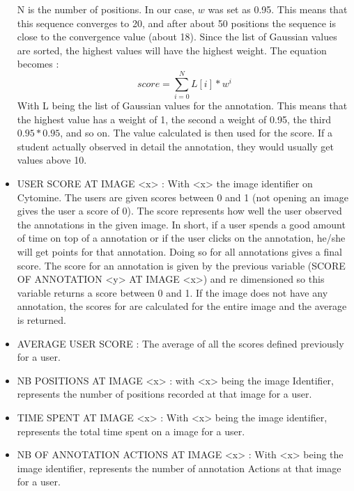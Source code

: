 \documentclass[a4paper,11pt]{report}
\numberwithin{figure}{section} %
\begin{document}
\begin{itemize}
N is the number of positions.
In our case, $w$ was set as 0.95.
This means that this sequence converges to 20, and after about 50 positions the sequence is close to the convergence value (about 18).
Since the list of Gaussian values are sorted, the highest values will have the highest weight.
The equation becomes :
	\[score = \sum\limits_{i=0}^N L[i]*w^i\]
With L being the list of Gaussian values for the annotation.
This means that the highest value has a weight of 1, the second a weight of 0.95, the third $0.95*0.95$, and so on.
The value calculated is then used for the score.
If a student actually observed in detail the annotation, they would usually get values above 10.\\

    \item[\textbullet] USER SCORE AT IMAGE <x> : With <x> the image identifier on Cytomine.
    The users are given scores between 0 and 1 (not opening an image gives the user a score of 0).
    The score represents how well the user observed the annotations in the given image.
    In short, if a user spends a good amount of time on top of a annotation or if the user clicks on the annotation, he/she will get points for that annotation.
    Doing so for all annotations gives a final score.
    The score for an annotation is given by the previous variable (SCORE OF ANNOTATION <y> AT IMAGE <x>) and re dimensioned so this variable returns a score between 0 and 1.
    If the image does not have any annotation, the scores for are calculated for the entire image and the average is returned. \\
    
    \item[\textbullet] AVERAGE USER SCORE : The average of all the scores defined previously for a user. \\
    
    \item[\textbullet] NB POSITIONS AT IMAGE <x> : with <x> being the image Identifier, represents the number of positions recorded at that image for a user. \\
    
   \item[\textbullet] TIME SPENT AT IMAGE <x> : With <x> being the image identifier, represents the total time spent on a image for a user. \\
   
   \item[\textbullet] NB OF ANNOTATION ACTIONS AT IMAGE <x> : With <x> being the image identifier, represents the number of annotation Actions at that image for a user. \\
      

\end{itemize}
\end{document}
